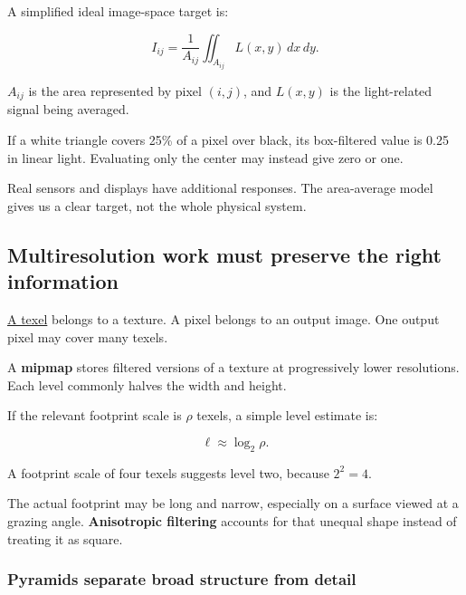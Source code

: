 \hypertarget{04-visual-computing-ii-ch042-a-pixel-value-can-be-an-average-over-an-area}{}

A simplified ideal image-space target is:

\[
I_{ij}=\frac1{A_{ij}}\iint_{A_{ij}}L(x,y)\,dx\,dy.
\]

\(A_{ij}\) is the area represented by pixel \((i,j)\), and \(L(x,y)\) is the light-related signal being averaged.

If a white triangle covers 25\% of a pixel over black, its box-filtered value is 0.25 in linear light. Evaluating only the center may instead give zero or one.

Real sensors and displays have additional responses. The area-average model gives us a clear target, not the whole physical system.

\subsection{Multiresolution work must preserve the right information}\label{04-visual-computing-ii-ch042-multiresolution-work-must-preserve-the-right-information}

\hypertarget{04-visual-computing-ii-ch042-multiresolution-work-must-preserve-the-right-information}{}

\hyperref[appendix-b677a85ba76f]{A texel} belongs to a texture. A pixel belongs to an output image. One output pixel may cover many texels.

A \textbf{mipmap} stores filtered versions of a texture at progressively lower resolutions. Each level commonly halves the width and height.

If the relevant footprint scale is \(\rho\) texels, a simple level estimate is:

\[
\ell\approx\log_2\rho.
\]

A footprint scale of four texels suggests level two, because \(2^2=4\).

The actual footprint may be long and narrow, especially on a surface viewed at a grazing angle. \textbf{Anisotropic filtering} accounts for that unequal shape instead of treating it as square.

\subsubsection{Pyramids separate broad structure from detail}\label{04-visual-computing-ii-ch042-pyramids-separate-broad-structure-from-detail}

\hypertarget{04-visual-computing-ii-ch042-pyramids-separate-broad-structure-from-detail}{}

